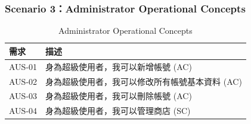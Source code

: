 \documentclass[a4paper, 12pt]{article}
\begin{document}
\subsubsection{Scenario 3：Administrator Operational Concepts}
\begin{table}[h]
    \centering
    \renewcommand{\arraystretch}{1.35}
    \begin{tabular}{|p{3cm}|p{10cm}|}
        \hline
        \textbf{需求} & \textbf{描述} \\
        \hline
        AUS-01 & 身為超級使用者，我可以新增帳號 (AC) \\
        \hline
        AUS-02 & 身為超級使用者，我可以修改所有帳號基本資料 (AC) \\
        \hline
        AUS-03 & 身為超級使用者，我可以刪除帳號 (AC) \\
        \hline
        AUS-04 & 身為超級使用者，我可以管理商店 (SC) \\
        \hline
    \end{tabular}
    \caption{Administrator Operational Concepts}
    \label{tab:admin-user-stories-requirements}
\end{table}
\end{document}
